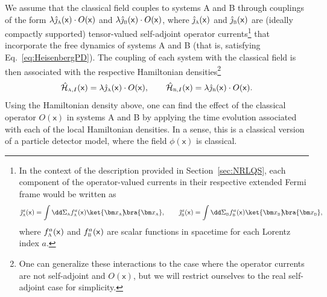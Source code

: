 \documentclass[letterpaper,12pt,titlepage,oneside,final]{book}
\newcommand{\mf}{\mathsf}%
\newcommand{\tc}[1]{\textsc{#1}}
\begin{document}
We assume that the classical field couples to systems A and B through couplings of the form $\lambda \hat{\jmath}_\tc{a}(\mf x) \cdot O(\mf x)$ and $\lambda \hat{\jmath}_\tc{b}(\mf x) \cdot O(\mf x)$, where $\hat{\jmath}_\tc{a}(\mf x)$ and $\hat{\jmath}_\tc{b}(\mf x)$ are (ideally compactly supported) tensor-valued self-adjoint operator currents\footnote{In the context of the description provided in Section~\ref{sec:NRLQS}, each component of the operator-valued currents in their respective extended Fermi frame would be written as
\begin{equation}
    \hat{\jmath}_\tc{a}^a(\mf x) = \int \dd\Sigma_\tc{a} f_\tc{a}^a(\mf x) \ket{\bm x_\tc{a}}\!\!\bra{\bm x_\tc{a}}, \quad \quad 
    \hat{\jmath}_\tc{b}^a(\mf x) = \int \dd\Sigma_\tc{b} f_\tc{b}^a(\mf x) \ket{\bm x_\tc{b}}\!\!\bra{\bm x_\tc{b}},
\end{equation}
where $f_\tc{a}^a(\mf x)$ and $f_\tc{b}^a(\mf x)$ are scalar functions in spacetime for each Lorentz index $a$.} that incorporate the free dynamics of systems A and B (that is, satisfying Eq.~\eqref{eq:HeisenbergPD}). The coupling of each system with the classical field is then associated with the respective Hamiltonian densities\footnote{One can generalize these interactions to the case where the operator currents are not self-adjoint and $O(\mf x)$, but we will restrict ourselves to the real self-adjoint case for simplicity.}
\begin{equation}
    \hat{\mathcal{H}}_{\tc{a},I}(\mf x) = \lambda \hat{\jmath}_\tc{a}(\mf x) \cdot O(\mf x),\quad \quad \hat{\mathcal{H}}_{\tc{b},I}(\mf x) = \lambda \hat{\jmath}_\tc{b}(\mf x) \cdot O(\mf x).
\end{equation}
Using the Hamiltonian density above, one can find the effect of the classical operator $O(\mf x)$ in systems A and B by applying the time evolution associated with each of the local Hamiltonian densities. In a sense, this is a classical version of a particle detector model, where the field $\phi(\mf x)$ is classical.
\end{document}
